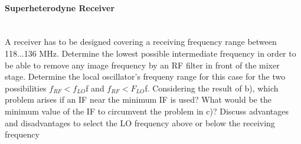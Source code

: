 \paragraph{Superheterodyne Receiver}\mbox{}\\
A receiver has to be designed covering a receiving frequency range between 118...136 MHz.
Determine the lowest possible intermediate frequency in order to be able to remove any image
frequency by an RF filter in front of the mixer stage.
Determine the local oscillator's frequeny range for this case for the two possibilities $f_{RF}<f_{LO}$f and
$f_{RF}<F_{LO}$f. Considering the result of b), which problem arises if an IF near the minimum IF is used? What would be the minimum value of the IF to circumvent the problem in c)? Discuss advantages and disadvantages to select the LO frequency above or below the receiving frequency\newline\newline
